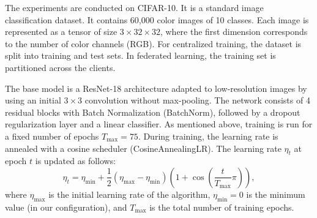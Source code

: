\documentclass[letterpaper]{article} %
\begin{document}
The experiments are conducted on CIFAR-10. It is a standard image classification dataset. It contains 60{,}000 color images of 10 classes. Each image is represented as a tensor of size $3 \times 32 \times 32$, where the first dimension corresponds to the number of color channels (RGB). For centralized training, the dataset is split into training and test sets. In federated learning, the training set is partitioned across the clients.

The base model is a ResNet-18 architecture adapted to low-resolution images by using an initial $3\times3$ convolution without max-pooling. The network consists of 4 residual blocks with Batch Normalization (BatchNorm), followed by a dropout regularization layer and a linear classifier. As mentioned above, training is run for a fixed number of epochs $T_{\max}=75$. During training, the learning rate is annealed with a cosine scheduler (CosineAnnealingLR). The learning rate $\eta_t$ at epoch $t$ is updated as follows:
\begin{equation}
\eta_t = \eta_{\text{min}} + \frac{1}{2}(\eta_{\text{max}} - \eta_{\text{min}})\left(1 + \cos\left(\frac{t}{T_{\text{max}}}\pi\right)\right),
\end{equation}
where $\eta_{\text{max}}$ is the initial learning rate of the algorithm, $\eta_{\text{min}} = 0$ is the minimum value (in our configuration), and $T_{\text{max}}$ is the total number of training epochs.
\end{document}
